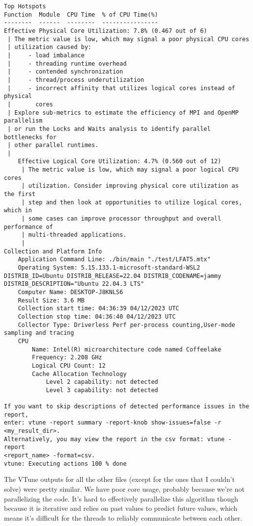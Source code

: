 \documentclass[12pt]{article}
\begin{document}
\begin{verbatim}
Top Hotspots
Function  Module  CPU Time  % of CPU Time(%)
--------  ------  --------  ----------------
Effective Physical Core Utilization: 7.8% (0.467 out of 6)
 | The metric value is low, which may signal a poor physical CPU cores
 | utilization caused by:
 |     - load imbalance
 |     - threading runtime overhead
 |     - contended synchronization
 |     - thread/process underutilization
 |     - incorrect affinity that utilizes logical cores instead of physical
 |       cores
 | Explore sub-metrics to estimate the efficiency of MPI and OpenMP parallelism
 | or run the Locks and Waits analysis to identify parallel bottlenecks for
 | other parallel runtimes.
 |
    Effective Logical Core Utilization: 4.7% (0.560 out of 12)
     | The metric value is low, which may signal a poor logical CPU cores
     | utilization. Consider improving physical core utilization as the first
     | step and then look at opportunities to utilize logical cores, which in
     | some cases can improve processor throughput and overall performance of
     | multi-threaded applications.
     |
Collection and Platform Info
    Application Command Line: ./bin/main "./test/LFAT5.mtx" 
    Operating System: 5.15.133.1-microsoft-standard-WSL2 DISTRIB_ID=Ubuntu DISTRIB_RELEASE=22.04 DISTRIB_CODENAME=jammy DISTRIB_DESCRIPTION="Ubuntu 22.04.3 LTS"
    Computer Name: DESKTOP-J8KNLS6
    Result Size: 3.6 MB 
    Collection start time: 04:36:39 04/12/2023 UTC
    Collection stop time: 04:36:40 04/12/2023 UTC
    Collector Type: Driverless Perf per-process counting,User-mode sampling and tracing
    CPU
        Name: Intel(R) microarchitecture code named Coffeelake
        Frequency: 2.208 GHz
        Logical CPU Count: 12
        Cache Allocation Technology
            Level 2 capability: not detected
            Level 3 capability: not detected

If you want to skip descriptions of detected performance issues in the report,
enter: vtune -report summary -report-knob show-issues=false -r <my_result_dir>.
Alternatively, you may view the report in the csv format: vtune -report
<report_name> -format=csv.
vtune: Executing actions 100 % done      
    \end{verbatim}

    The VTune outputs for all the other files (except for the ones that I couldn't solve) were pretty similar. We have poor core usage, probably because we're not parallelizing the code. It's hard to effectively parallelize this algorithm though because it is iterative and relies on past values to predict future values, which means it's difficult for the threads to reliably communicate between each other.
\end{document}
